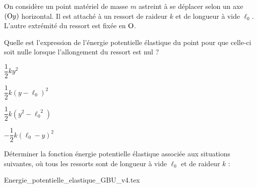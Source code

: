 \begin{enonce}
	On considère un point matériel \ptM de masse $m$ astreint à se déplacer selon un axe $(\ptO y)$ horizontal. Il est attaché à un ressort de raideur $k$ et de longueur à vide $\ell_0$. L'autre extrémité du ressort est fixée en $\ptO$. 
	
	Quelle est l'expression de l'énergie potentielle élastique du point \ptM pour que celle-ci soit nulle lorsque l'allongement du ressort est nul ?
	
	\begin{listeQCM4Colonnes}
	\item $\dfrac{1}{2}ky^2$
	\item $\dfrac{1}{2} k(y-\ell_0)^2$
	\item $\dfrac{1}{2}k(y^2-{\ell_0}^2)$
	\item $-\dfrac{1}{2}k(\ell_0-y)^2$
	\end{listeQCM4Colonnes}
		\bigskip\smallskip
\end{enonce}

\reponse{\reponseB}



\finEntrainement






\hauteurLargeurCadreReponse		{8mm}{6cm}
\initialisationEntrainement

Déterminer la fonction énergie potentielle élastique associée aux situations suivantes, où tous les ressorts sont de longueur à vide $\ell_0$ et de raideur $k$ :

\begin{center}
{Energie_potentielle_elastique_GBU_v4.tex}
\end{center}

